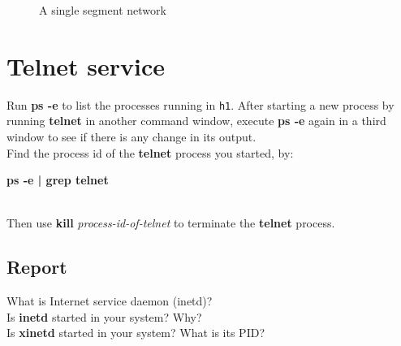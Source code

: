\documentclass[10pt,a4paper]{article}
\numberwithin{equation}{section}
\numberwithin{figure}{section}
\numberwithin{table}{section}
\begin{document}
\begin{center}
\begin{minipage}{0.48\textwidth}
\begin{flushright}
\begin{figure}[H]
    \caption{A single segment network}        
\end{figure}
        \end{flushright}
    \end{minipage}
\end{center}



    \section{Telnet service}
    Run \textbf{ps -e} to list the processes running in \texttt{h1}.
    After starting a new process by running \textbf{telnet} in another command window, execute \textbf{ps -e} again in a third window to see if there is any change in its output. \\
    Find the process id of the \textbf{telnet} process you started, by: \\
    \centerline{\textbf{ps -e | grep telnet}} \\
    Then use \textbf{kill} \textit{process-id-of-telnet} to terminate the \textbf{telnet} process.
    \subsection*{Report}
    What is Internet service daemon (inetd)? \\
    Is \textbf{inetd} started in your system?
    Why? \\
    Is \textbf{xinetd} started in your system? What is its PID? \\

\end{document}
